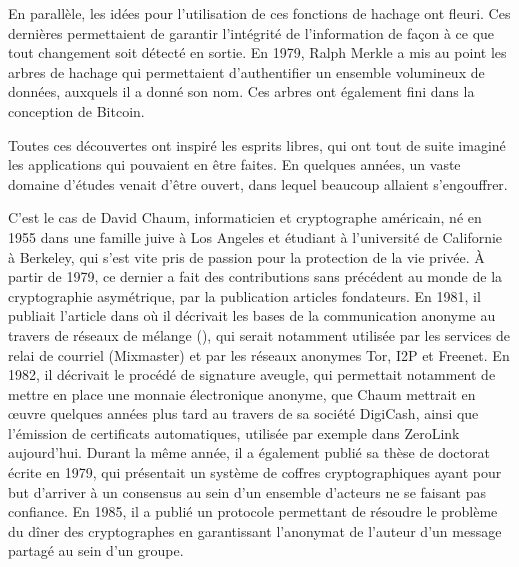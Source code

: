 En parallèle, les idées pour l'utilisation de ces fonctions de hachage ont fleuri. Ces dernières permettaient de garantir l'intégrité de l'information de façon à ce que tout changement soit détecté en sortie. En 1979, Ralph Merkle a mis au point les arbres de hachage qui permettaient d'authentifier un ensemble volumineux de données, auxquels il a donné son nom. Ces arbres ont également fini dans la conception de Bitcoin.


Toutes ces découvertes ont inspiré les esprits libres, qui ont tout de suite imaginé les applications qui pouvaient en être faites. En quelques années, un vaste domaine d'études venait d'être ouvert, dans lequel beaucoup allaient s'engouffrer.

C'est le cas de David Chaum, informaticien et cryptographe américain, né en 1955 dans une famille juive à Los Angeles et étudiant à l'université de Californie à Berkeley, qui s'est vite pris de passion pour la protection de la vie privée. À partir de 1979, ce dernier a fait des contributions sans précédent au monde de la cryptographie asymétrique, par la publication articles fondateurs. En 1981, il publiait l'article  dans  où il décrivait les bases de la communication anonyme au travers de réseaux de mélange (), qui serait notamment utilisée par les services de relai de courriel (Mixmaster) et par les réseaux anonymes Tor, I2P et Freenet. En 1982, il décrivait le procédé de signature aveugle, qui permettait notamment de mettre en place une monnaie électronique anonyme, que Chaum mettrait en œuvre quelques années plus tard au travers de sa société DigiCash, ainsi que l'émission de certificats automatiques, utilisée par exemple dans ZeroLink aujourd'hui. Durant la même année, il a également publié sa thèse de doctorat écrite en 1979, qui présentait un système de coffres cryptographiques ayant pour but d'arriver à un consensus au sein d'un ensemble d'acteurs ne se faisant pas confiance. En 1985, il a publié un protocole permettant de résoudre le problème du dîner des cryptographes en garantissant l'anonymat de l'auteur d'un message partagé au sein d'un groupe. %

